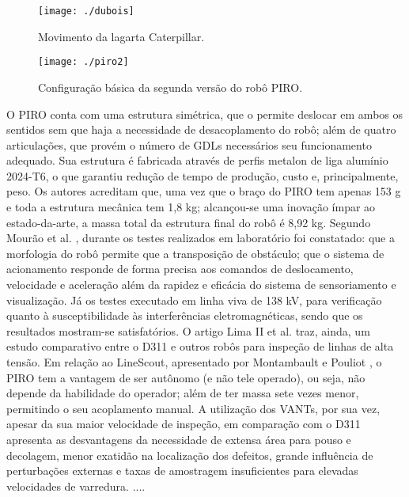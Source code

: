 \begin{figure} [h!]	
	\caption{Movimento da lagarta Caterpillar.}
	\label{img:dubois}											 
	\centering													 
	\texttt{[image: ./dubois]}
\end{figure}													 

\begin{figure} [h!]	
	\caption{Configuração básica da segunda versão do robô PIRO.}
	\label{img:piro2}											 
	\centering													 
	\texttt{[image: ./piro2]}
\end{figure}													 

O PIRO conta com uma estrutura simétrica, que o permite deslocar em ambos os sentidos sem que haja a necessidade de desacoplamento do robô; além de quatro articulações, que provém o número de GDLs necessários seu funcionamento adequado. Sua estrutura é fabricada através de perfis metalon de liga alumínio 2024-T6, o que garantiu redução de tempo de produção, custo e, principalmente, peso. Os autores acreditam que, uma vez que o braço do PIRO tem apenas 153 g e toda a estrutura mecânica tem 1,8 kg; alcançou-se uma inovação ímpar ao estado-da-arte, a massa total da estrutura final do robô é 8,92 kg.
Segundo Mourão et al. \cite{mourao2015robolinhas}, durante os testes realizados em laboratório foi constatado: que a morfologia do robô permite que a transposição de obstáculo; que o sistema de acionamento responde de forma precisa aos comandos de deslocamento, velocidade e aceleração além da rapidez e eficácia do sistema de sensoriamento e visualização. Já os testes executado em linha viva de 138 kV, para verificação quanto à susceptibilidade às interferências eletromagnéticas, sendo que os resultados mostram-se satisfatórios. 
O artigo Lima II et al. \cite{iirobo} traz, ainda, um estudo comparativo entre o D311 e outros robôs para inspeção de linhas de alta tensão. Em relação ao LineScout, apresentado por Montambault e Pouliot \cite{montambault2007design} , o PIRO tem a vantagem de ser autônomo (e não tele operado), ou seja, não depende da habilidade do operador; além de ter massa sete vezes menor, permitindo o seu acoplamento manual. A utilização dos VANTs, por sua vez, apesar da sua maior velocidade de inspeção, em comparação com o D311 apresenta as desvantagens da necessidade de extensa área para pouso e decolagem, menor exatidão na localização dos defeitos, grande influência de perturbações externas e taxas de amostragem insuficientes para elevadas velocidades de varredura.
....


